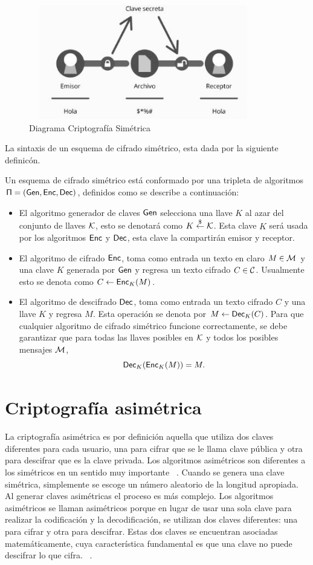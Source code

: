 \begin{figure}[H]
\centering
	\includegraphics[width=10cm, height=5cm]{./images/Cripto_Simetrica.jpg}
	\caption{Diagrama Criptografía Simétrica}
	\label{fig:1-2-3}
\end{figure}
La sintaxis de un esquema de cifrado sim\'etrico, esta dada por la siguiente definic\'on.
\begin{definition} 
Un esquema de cifrado sim\'etrico est\'a conformado por una tripleta de algoritmos 
$\sf \Pi=(Gen, Enc, Dec)$, definidos como se describe a continuaci\'on:
\begin{itemize}
\item  El algoritmo generador de claves $\sf Gen$ selecciona una llave  $K$ al azar del conjunto de llaves $\cal K$, esto se denotar\'a como $K \stackrel{\$}\leftarrow {\cal K}$.
Esta clave $K$  ser\'a usada por los algoritmos  $\sf Enc$ y $\sf Dec$, esta clave la compartir\'an  emisor y receptor. 
\item El algoritmo de cifrado $\sf Enc$, toma como entrada un texto en claro  $M \in {\cal M}$ y una clave $K$ generada por  $\sf Gen$  y regresa un texto cifrado $C \in {\cal C}$.  Usualmente esto se denota como $C \leftarrow {\sf Enc}_K(M)$.
 \item El algoritmo de descifrado $\sf Dec$, toma como entrada un texto cifrado $C$ y una llave $K$ y regresa $M$. Esta operaci\'on se denota por  $M \leftarrow {\sf Dec}_K(C)$.
Para que cualquier algoritmo de cifrado sim\'etrico funcione correctamente, se debe garantizar que para
todas las llaves posibles en  $\cal K$ y todos los posibles mensajes $\cal M$, $$ {\sf Dec}_K({\sf Enc}_K(M)) = M.$$
\end{itemize}
\end{definition}

\section{Criptografía asimétrica}
La criptografía asimétrica es por definición aquella que utiliza dos claves diferentes para cada usuario, una para cifrar que se le llama clave pública y otra para descifrar que es la clave privada. Los algoritmos asimétricos son diferentes a los simétricos en un sentido muy importante ~\cite{sime}. Cuando se genera una clave simétrica, simplemente se escoge un número aleatorio de la longitud apropiada. Al generar claves asimétricas el proceso es más complejo. Los algoritmos asimétricos se llaman asimétricos porque en lugar de usar una sola clave para realizar la codificación y la decodificación, se utilizan dos claves diferentes: una para cifrar y otra para descifrar. Estas dos claves se encuentran asociadas matemáticamente, cuya característica fundamental es que una clave no puede descifrar lo que cifra. ~\cite{sime}.

